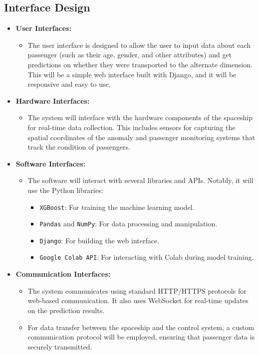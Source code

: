 \documentclass[15pt]{article}
\begin{document}
\subsection{Interface Design}
\begin{itemize}
    \item \textbf{User Interfaces:} 
    \begin{itemize}
        \item The user interface is designed to allow the user to input data about each passenger (such as their age, gender, and other attributes) and get predictions on whether they were transported to the alternate dimension. This will be a simple web interface built with Django, and it will be responsive and easy to use.
    \end{itemize}
    
    \item \textbf{Hardware Interfaces:} 
    \begin{itemize}
        \item The system will interface with the hardware components of the spaceship for real-time data collection. This includes sensors for capturing the spatial coordinates of the anomaly and passenger monitoring systems that track the condition of passengers.
    \end{itemize}

    \item \textbf{Software Interfaces:} 
    \begin{itemize}
        \item The software will interact with several libraries and APIs. Notably, it will use the Python libraries:
        \begin{itemize}
            \item \texttt{XGBoost}: For training the machine learning model.
            \item \texttt{Pandas} and \texttt{NumPy}: For data processing and manipulation.
            \item \texttt{Django}: For building the web interface.
            \item \texttt{Google Colab API}: For interacting with Colab during model training.
        \end{itemize}
    \end{itemize}

    \item \textbf{Communication Interfaces:} 
    \begin{itemize}
        \item The system communicates using standard HTTP/HTTPS protocols for web-based communication. It also uses WebSocket for real-time updates on the prediction results.
        \item For data transfer between the spaceship and the control system, a custom communication protocol will be employed, ensuring that passenger data is securely transmitted.
    \end{itemize}
\end{itemize}
\end{document}
